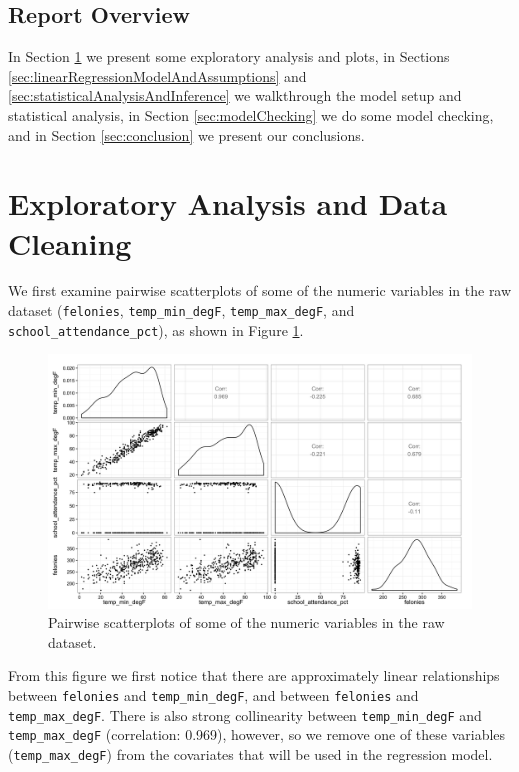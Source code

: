 \documentclass[11pt,notitlepage]{article}
\begin{document}
\subsection{Report Overview}

In Section \ref{sec:eda} we present some exploratory analysis and plots, in Sections \ref{sec:linearRegressionModelAndAssumptions} and \ref{sec:statisticalAnalysisAndInference} we walkthrough the model setup and statistical analysis, in Section \ref{sec:modelChecking} we do some model checking, and in Section \ref{sec:conclusion} we present our conclusions. 



\section{Exploratory Analysis and Data Cleaning}
\label{sec:eda}

We first examine pairwise scatterplots of some of the numeric variables in the raw dataset (\texttt{felonies}, \texttt{temp_min_degF}, \texttt{temp_max_degF}, and \texttt{school_attendance_pct}), as shown in Figure \ref{fig:pairsNumericExclAcc}.

\begin{figure}[!h]
	\centering
	\captionsetup{width=0.9\textwidth}
	\includegraphics[width=6in]{figures/pairsNumericExclAcc.png}
	\caption{Pairwise scatterplots of some of the numeric variables in the raw dataset.}
	\label{fig:pairsNumericExclAcc}
\end{figure}

From this figure we first notice that there are approximately linear relationships between \texttt{felonies} and \texttt{temp_min_degF}, and between \texttt{felonies} and \texttt{temp_max_degF}. There is also strong collinearity between \texttt{temp_min_degF} and \texttt{temp_max_degF} (correlation: 0.969), however, so we remove one of these variables (\texttt{temp_max_degF}) from the covariates that will be used in the regression model.
\end{document}
